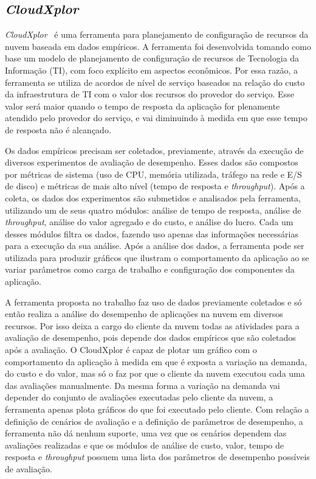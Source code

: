 \subsection{{\em CloudXplor}}

{\em CloudXplor}~\cite{malkowski2010cloudxplor} é uma ferramenta para
planejamento de configuração de recursos da nuvem baseada em dados empíricos. A ferramenta
foi desenvolvida tomando como base um modelo de planejamento de configuração de
recursos de Tecnologia da Informação (TI), com foco explícito em aspectos econômicos.
Por essa razão, a ferramenta se utiliza de acordos de nível de serviço baseados na relação do custo
da infraestrutura de TI com o valor dos recursos do provedor do serviço. Esse
valor será maior quando o tempo de resposta da aplicação for plenamente atendido
pelo provedor do serviço, e vai diminuindo à medida em que esse tempo de resposta
não é alcançado.

Os dados empíricos precisam ser coletados, previamente, através da execução de diversos experimentos de avaliação de desempenho. Esses dados
são compostos por métricas de sistema (uso de CPU, memória utilizada, tráfego na rede e E/S de disco) e métricas de mais alto nível (tempo de resposta e \textit{throughput}). Após a coleta, os dados dos experimentos são submetidos e analisados pela ferramenta, utilizando um de seus quatro módulos: análise de tempo de
resposta, análise de \textit{throughput}, análise do valor agregado e do custo,
e análise do lucro. Cada um desses módulos filtra os dados, fazendo uso apenas
das informações necessárias para a execução da sua análise. Após a análise dos
 dados, a ferramenta pode ser utilizada para produzir gráficos que ilustram o comportamento da aplicação ao se variar
parâmetros como carga de trabalho e configuração dos componentes da aplicação.


A ferramenta proposta no trabalho faz uso de dados previamente coletados
e só então realiza a análise do desempenho de aplicações na nuvem
em diversos recursos. Por isso deixa a cargo do cliente da nuvem todas as
atividades para a avaliação de desempenho, pois depende dos dados empíricos que
são coletados após a avaliação. O CloudXplor é capaz de plotar um gráfico com o
comportamento da aplicação à medida em que é exposta a variação na demanda, do
custo e do valor, mas só o faz por que o cliente da nuvem executou cada uma das
avaliações manualmente. Da mesma forma a variação na demanda vai depender do
conjunto de avaliações executadas pelo cliente da nuvem, a ferramenta apenas
plota gráficos do que foi executado pelo cliente. Com relação a definição de
cenários de avaliação e a definição de parâmetros de desempenho, a ferramenta
não dá nenhum suporte, uma vez que os cenários dependem das avaliações
realizadas e que os módulos de análise de custo, valor, tempo de resposta e {\em
throughput} possuem uma lista dos parâmetros de desempenho possíveis de
avaliação.


